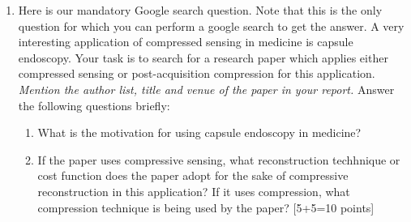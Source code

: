 \documentclass[11pt]{article}
\begin{document}
\begin{enumerate}
\item Here is our mandatory Google search question. Note that this is the only question for which you can perform a google search to get the answer. A very interesting application of compressed sensing in medicine is capsule endoscopy. Your task is to search for a research paper which applies either compressed sensing or post-acquisition compression for this application. \textit{Mention the author list, title and venue of the paper in your report.} Answer the following questions briefly:
\begin{enumerate}
\item What is the motivation for using capsule endoscopy in medicine?
\item If the paper uses compressive sensing, what reconstruction techhnique or cost function does the paper adopt for the sake of compressive reconstruction in this application?  If it uses compression, what compression technique is being used by the paper? \textsf{[5+5=10 points]}
\end{enumerate} 



\end{enumerate}
\end{document}
